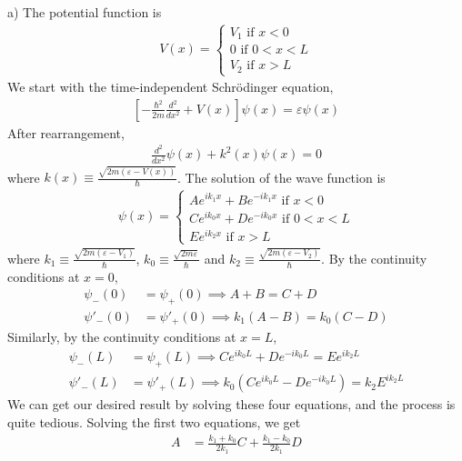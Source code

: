\documentclass[12pt]{book} %
\numberwithin{equation}{chapter}
\def\e{\varepsilon}
\begin{document}
\begin{solbox}
a) The potential function is
\begin{align*}
V(x)=
\begin{cases}
V_{1}\text{ if }x<0\\
0\text{ if }0<x<L\\
V_{2}\text{ if }x>L
\end{cases}
\end{align*}
We start with the time-independent Schr\"{o}dinger equation,
\begin{align*}
\left[-\frac{\hbar^{2}}{2m}\frac{d^{2}}{dx^{2}}+V(x)\right]\psi(x)=\e\psi(x)
\end{align*}
After rearrangement,
\begin{align*}
\frac{d^{2}}{dx^{2}}\psi(x)+k^{2}(x)\psi(x)=0
\end{align*}
where $k(x)\equiv\frac{\sqrt{2m(\e-V(x))}}{\hbar}$.\bigskip\newline
The solution of the wave function is
\begin{align*}
\psi(x)=
\begin{cases}
Ae^{ik_{1}x}+Be^{-ik_{1}x}\text{ if }x<0\\
Ce^{ik_{0}x}+De^{-ik_{0}x}\text{ if }0<x<L\\
Ee^{ik_{2}x}\text{ if }x>L
\end{cases}
\end{align*}
where $k_{1}\equiv\frac{\sqrt{2m(\e-V_{1})}}{\hbar}$, $k_{0}\equiv\frac{\sqrt{2m\e}}{\hbar}$ and $k_{2}\equiv\frac{\sqrt{2m(\e-V_{2})}}{\hbar}$.\bigskip\newline
By the continuity conditions at $x=0$,
\begin{align*}
\psi_{-}(0)&=\psi_{+}(0)\implies A+B=C+D\\
\psi'_{-}(0)&=\psi'_{+}(0)\implies k_{1}(A-B)=k_{0}(C-D)
\end{align*}
Similarly, by the continuity conditions at $x=L$,
\begin{align*}
\psi_{-}(L)&=\psi_{+}(L)\implies Ce^{ik_{0}L}+De^{-ik_{0}L}=Ee^{ik_{2}L}\\
\psi'_{-}(L)&=\psi'_{+}(L)\implies k_{0}\left(Ce^{ik_{0}L}-De^{-ik_{0}L}\right)=k_{2}E^{ik_{2}L}
\end{align*}
We can get our desired result by solving these four equations, and the process is quite tedious.\bigskip\newline
Solving the first two equations, we get
\begin{align*}
A&=\frac{k_{1}+k_{0}}{2k_{1}}C+\frac{k_{1}-k_{0}}{2k_{1}}D\\

\end{align*}
\end{solbox}
\end{document}
